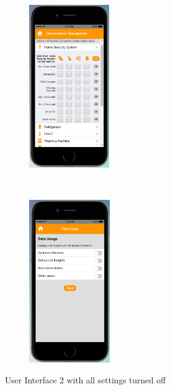 \begin{appendices}
\begin{figure}
\begin{subfigure}[t]{0.2\textwidth}
	\end{subfigure}%
	~~~~~
	\begin{subfigure}[t]{0.2\textwidth}
		\centering
		\includegraphics[height=2.8in]{figures/ui2allOff3.png}
	\end{subfigure}%
	~~~~~
	\begin{subfigure}[t]{0.2\textwidth}
		\centering
		\includegraphics[height=2.8in]{figures/ui2allOff4.png}
	\end{subfigure}%
	\caption{User Interface 2 with all settings turned off}
	\label{fig:ui2AllOff}
\end{figure}


\end{appendices}
